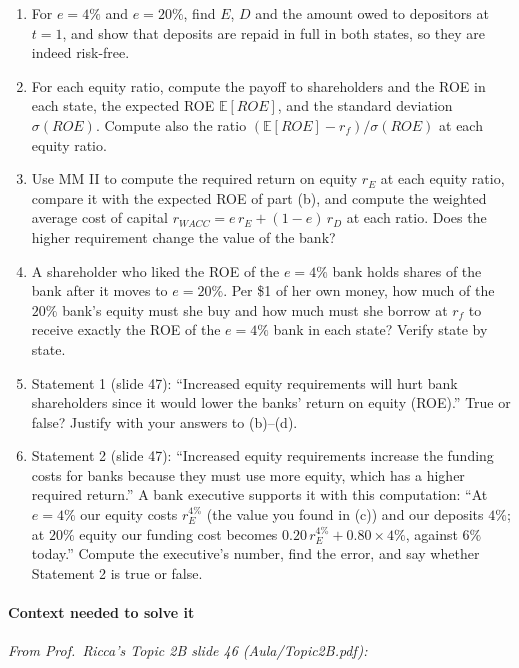 \documentclass[11pt,a4paper]{article}
\numberwithin{equation}{section}
\begin{document}
\begin{enumerate}
\def\labelenumi{\alph{enumi}.}
\item
  For \(e = 4\%\) and \(e = 20\%\), find \(E\), \(D\) and the amount owed to depositors at
  \(t = 1\), and show that deposits are repaid in full in both states, so they are indeed risk-free.
\item
  For each equity ratio, compute the payoff to shareholders and the ROE in each state, the expected
  ROE \(\mathbb{E}[ROE]\), and the standard deviation \(\sigma(ROE)\). Compute also the ratio
  \((\mathbb{E}[ROE] - r_f)/\sigma(ROE)\) at each equity ratio.
\item
  Use MM II to compute the required return on equity \(r_E\) at each equity ratio, compare it with
  the expected ROE of part (b), and compute the weighted average cost of capital
  \(r_{WACC} = e\,r_E + (1 - e)\,r_D\) at each ratio. Does the higher requirement change the value
  of the bank?
\item
  A shareholder who liked the ROE of the \(e = 4\%\) bank holds shares of the bank after it moves to
  \(e = 20\%\). Per \$1 of her own money, how much of the \(20\%\) bank's equity must she buy and
  how much must she borrow at \(r_f\) to receive exactly the ROE of the \(e = 4\%\) bank in each
  state? Verify state by state.
\item
  Statement 1 (slide 47): ``Increased equity requirements will hurt bank shareholders since it would
  lower the banks' return on equity (ROE).'' True or false? Justify with your answers to (b)--(d).
\item
  Statement 2 (slide 47): ``Increased equity requirements increase the funding costs for banks
  because they must use more equity, which has a higher required return.'' A bank executive supports
  it with this computation: ``At \(e = 4\%\) our equity costs \(r_E^{4\%}\) (the value you found in
  (c)) and our deposits \(4\%\); at \(20\%\) equity our funding cost becomes
  \(0.20\,r_E^{4\%} + 0.80 \times 4\%\), against \(6\%\) today.'' Compute the executive's number,
  find the error, and say whether Statement 2 is true or false.
\end{enumerate}

\paragraph{Context needed to solve it}

\emph{From Prof.~Ricca's Topic 2B slide 46 (Aula/Topic2B.pdf):}
\end{document}
